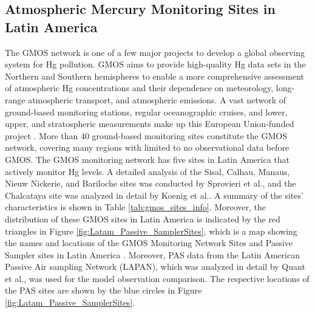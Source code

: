 \subsection{Atmospheric Mercury Monitoring Sites in Latin America} \label{c2_monitoring_site_characteristics}
\begin{flushleft}
 The GMOS network is one of a few major projects to develop a global observing system for Hg pollution. GMOS aims to provide high-quality Hg data sets in the Northern and Southern hemispheres to enable a more comprehensive assessment of atmospheric Hg concentrations and their dependence on meteorology, long-range atmospheric transport, and atmospheric emissions\cite{sprovieri_atmospheric_2016}. A vast network of ground-based monitoring stations, regular oceanographic cruises, and lower, upper, and stratospheric measurements make up this European Union-funded project \cite{koenig_seasonal_2021,sprovieri_atmospheric_2016}. More than 40 ground-based monitoring sites constitute the GMOS network, covering many regions with limited to no observational data before GMOS\cite{sprovieri_atmospheric_2016}. The GMOS monitoring network has five sites in Latin America that actively monitor Hg levels. A detailed analysis of the Sisal, Calhau, Manaus, Nieuw Nickerie, and Bariloche sites was conducted by Sprovieri et al.\cite{sprovieri_atmospheric_2016}, and the Chalcataya site was analyzed in detail by Koenig et al.\cite{koenig_seasonal_2021}. A summary of the sites' characteristics is shown in Table \ref{tab:gmos_sites_info}. Moreover, the distribution of these GMOS sites in Latin America is indicated by the red triangles in Figure \ref{fig:Latam_Passive_SamplerSites}, which is a map showing the names and locations of the GMOS Monitoring Network Sites and Passive Sampler sites in Latin America \cite{quant_measuring_2021,koenig_seasonal_2021}. Moreover, PAS data from the Latin American Passive Air sampling Network (LAPAN), which was analyzed in detail by Quant et al.\cite{quant_measuring_2021}, was used for the model observation comparison. The respective locations of the PAS sites are shown by the blue circles in Figure \ref{fig:Latam_Passive_SamplerSites}.
  \end{flushleft}
  
